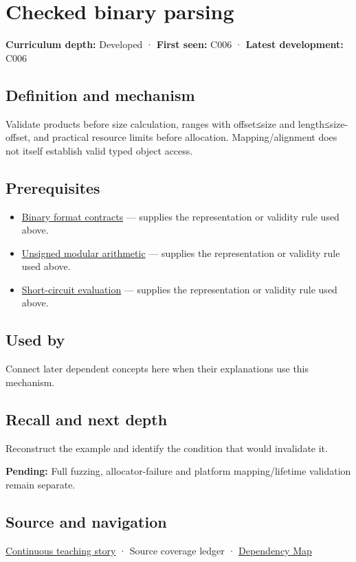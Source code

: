 \hypertarget{appendix-652d81568de9}{}\label{referencestart:appendix-652d81568de9}
\section{Checked binary parsing}\label{appendix-652d81568de9-checked-binary-parsing}

\textbf{Curriculum depth:} Developed · \textbf{First seen:} C006 · \textbf{Latest development:} C006

\subsection{Definition and mechanism}\label{appendix-652d81568de9-definition-and-mechanism}

Validate products before size calculation, ranges with offset≤size and length≤size-offset, and practical resource limits before allocation. Mapping/alignment does not itself establish valid typed object access.

\subsection{Prerequisites}\label{appendix-652d81568de9-prerequisites}

\begin{itemize}
\tightlist
\item
  \hyperref[appendix-590bbb2424c1]{Binary format contracts} --- supplies the representation or validity rule used above.
\item
  \hyperref[appendix-c99977d88b33]{Unsigned modular arithmetic} --- supplies the representation or validity rule used above.
\item
  \hyperref[appendix-2e245a6fa8d3]{Short-circuit evaluation} --- supplies the representation or validity rule used above.
\end{itemize}

\subsection{Used by}\label{appendix-652d81568de9-used-by}

Connect later dependent concepts here when their explanations use this mechanism.

\subsection{Recall and next depth}\label{appendix-652d81568de9-recall-and-next-depth}

Reconstruct the example and identify the condition that would invalidate it.

\textbf{Pending:} Full fuzzing, allocator-failure and platform mapping/lifetime validation remain separate.

\subsection{Source and navigation}\label{appendix-652d81568de9-source-and-navigation}

\hyperref[01-foundations-i-ch002-bytes-become-a-durable-agreement]{Continuous teaching story} · {Source coverage ledger} · \hyperref[appendix-4ad47bdd269a]{Dependency Map}

